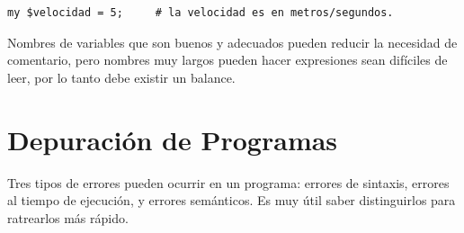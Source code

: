 \begin{verbatim}
my $velocidad = 5;     # la velocidad es en metros/segundos. 
\end{verbatim}
%
Nombres de variables que son buenos y adecuados pueden reducir la necesidad 
de comentario, pero nombres muy largos pueden hacer expresiones sean difíciles
de leer, por lo tanto debe existir un balance.


\section{Depuración de Programas}

Tres tipos de errores pueden ocurrir en un programa: errores
de sintaxis, errores al tiempo de ejecución, y  errores semánticos.
Es muy útil saber distinguirlos para ratrearlos más rápido.

